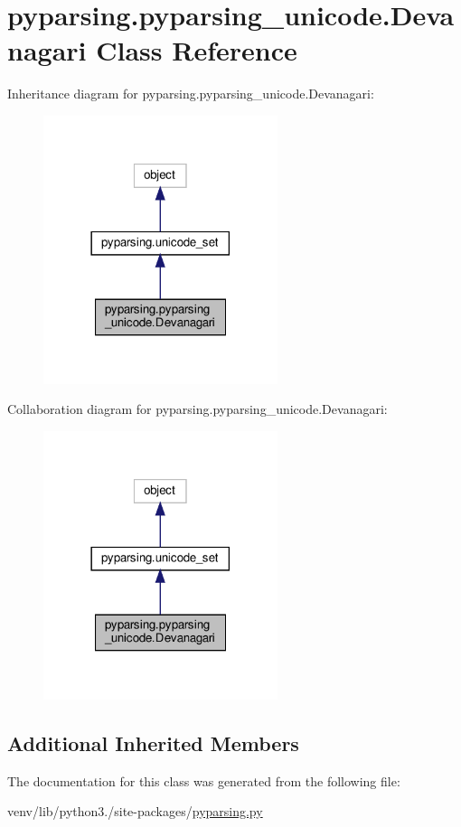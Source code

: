 \hypertarget{classpyparsing_1_1pyparsing__unicode_1_1Devanagari}{}\section{pyparsing.\+pyparsing\+\_\+unicode.\+Devanagari Class Reference}
\label{classpyparsing_1_1pyparsing__unicode_1_1Devanagari}


Inheritance diagram for pyparsing.\+pyparsing\+\_\+unicode.\+Devanagari\+:
\nopagebreak
\begin{figure}[H]
\begin{center}
\leavevmode
\includegraphics[width=194pt]{classpyparsing_1_1pyparsing__unicode_1_1Devanagari__inherit__graph}
\end{center}
\end{figure}


Collaboration diagram for pyparsing.\+pyparsing\+\_\+unicode.\+Devanagari\+:
\nopagebreak
\begin{figure}[H]
\begin{center}
\leavevmode
\includegraphics[width=194pt]{classpyparsing_1_1pyparsing__unicode_1_1Devanagari__coll__graph}
\end{center}
\end{figure}
\subsection*{Additional Inherited Members}


The documentation for this class was generated from the following file\+:\begin{DoxyCompactItemize}
\item 
venv/lib/python3./site-\/packages/\hyperlink{pyparsing_8py}{pyparsing.\+py}\end{DoxyCompactItemize}
